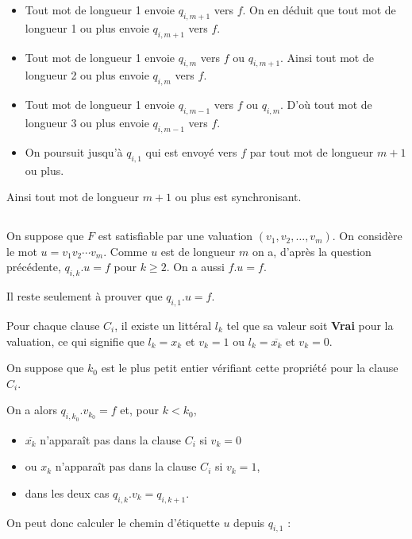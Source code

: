 \begin{itemize}
\item Tout mot de longueur 1 envoie $q_{i,m+1}$ vers $f$. On en déduit que tout mot de longueur 1 ou plus envoie $q_{i,m+1}$ vers $f$.

\item Tout mot de longueur 1 envoie $q_{i,m}$ vers $f$ ou $q_{i,m+1}$. Ainsi tout mot de longueur 2 ou plus envoie $q_{i,m}$ vers $f$.

\item Tout mot de longueur 1 envoie $q_{i,m-1}$ vers $f$ ou $q_{i,m}$. D'où tout mot de longueur 3 ou plus envoie $q_{i,m-1}$ vers $f$.

\item On poursuit jusqu'à $q_{i,1}$ qui est envoyé vers $f$ par tout mot de longueur $m+1$ ou plus. 
\end{itemize}
Ainsi tout mot de longueur $m+1$ ou plus est synchronisant.
\subsection{}
On suppose que $F$ est satisfiable par une valuation $(v_1,v_2,\ldots,v_m)$. On considère le mot $u=v_1v_2\cdots v_m$. Comme $u$ est de longueur $m$ on a, d'après la question précédente, $q_{i,k}.u =f$ pour $k\ge 2$. On a aussi $f.u=f$.

Il reste seulement à prouver que $q_{i,1}.u =f$.

Pour chaque clause $C_i$, il existe un littéral $l_k$ tel que sa valeur soit {\bf Vrai} pour la valuation, ce qui signifie que $l_k=x_k$ et $v_k=1$ ou $l_k=\overline{x_k}$ et $v_k=0$.

On suppose que $k_0$ est le plus petit entier vérifiant cette propriété pour la clause $C_i$.

On a alors $q_{i,k_0}.v_{k_0}=f$ et, pour $k < k_0$,

\begin{itemize}
  \item $\overline{x_k}$ n'apparaît pas dans la clause $C_i$ si $v_k=0$ 
  \item ou $x_k$ n'apparaît pas dans la clause $C_i$ si $v_k=1$, 
  \item dans les deux cas  $q_{i,k}.v_k = q_{i,k+1}$.
\end{itemize}
On peut donc calculer le chemin d'étiquette $u$ depuis $q_{i,1}$ :

